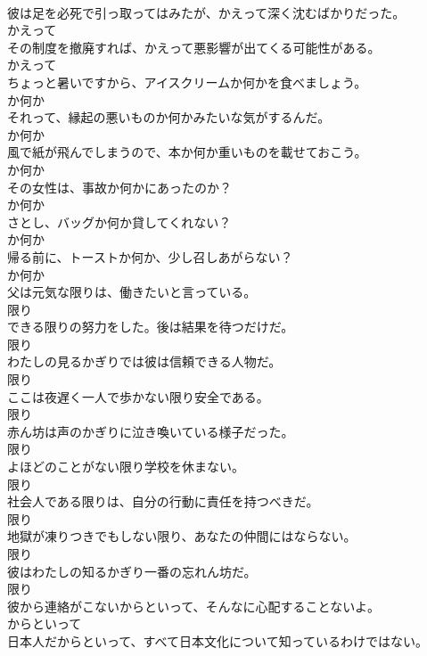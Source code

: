 \documentclass[8pt]{extreport}
\begin{document}
\begin{CJK}{UTF8}{min}
\\	彼は足を必死で引っ取ってはみたが、かえって深く沈むばかりだった。	
\\	かえって
\\	その制度を撤廃すれば、かえって悪影響が出てくる可能性がある。	
\\	かえって
\\	ちょっと暑いですから、アイスクリームか何かを食べましょう。	
\\	か何か
\\	それって、縁起の悪いものか何かみたいな気がするんだ。	
\\	か何か
\\	風で紙が飛んでしまうので、本か何か重いものを載せておこう。	
\\	か何か
\\	その女性は、事故か何かにあったのか？	
\\	か何か
\\	さとし、バッグか何か貸してくれない？	
\\	か何か
\\	帰る前に、トーストか何か、少し召しあがらない？	
\\	か何か
\\	父は元気な限りは、働きたいと言っている。	
\\	限り
\\	できる限りの努力をした。後は結果を待つだけだ。	
\\	限り
\\	わたしの見るかぎりでは彼は信頼できる人物だ。	
\\	限り
\\	ここは夜遅く一人で歩かない限り安全である。	
\\	限り
\\	赤ん坊は声のかぎりに泣き喚いている様子だった。	
\\	限り
\\	よほどのことがない限り学校を休まない。	
\\	限り
\\	社会人である限りは、自分の行動に責任を持つべきだ。	
\\	限り
\\	地獄が凍りつきでもしない限り、あなたの仲間にはならない。	
\\	限り
\\	彼はわたしの知るかぎり一番の忘れん坊だ。	
\\	限り
\\	彼から連絡がこないからといって、そんなに心配することないよ。	
\\	からといって
\\	日本人だからといって、すべて日本文化について知っているわけではない。	

\end{CJK}
\end{document}
